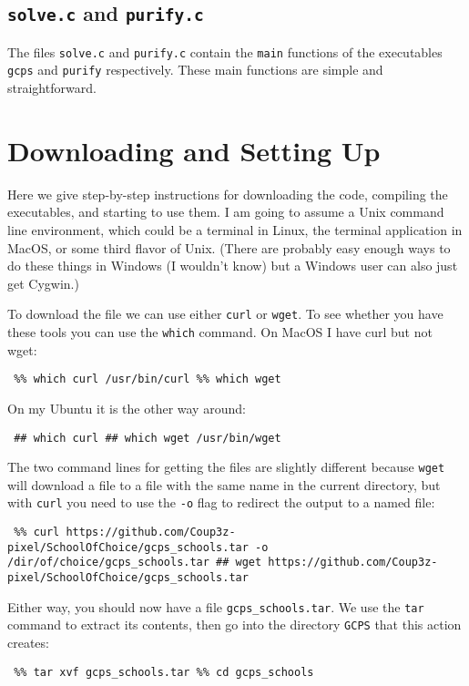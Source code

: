 \documentclass[12pt]{article}
\theoremstyle{definition}
\begin{document}
\begin{appendix}
\subsection{\texttt{solve.c} and  \texttt{purify.c}}

The files \texttt{solve.c} and \texttt{purify.c} contain the
\texttt{main} functions of the executables \texttt{gcps} and
\texttt{purify} respectively.  These main functions are
simple and straightforward.

\section{Downloading and Setting Up} \label{app:DownloadInstall}

Here we give step-by-step instructions for downloading the code,
compiling the executables, and starting to use them.  I am going to
assume a Unix command line environment, which could be a terminal in
Linux, the terminal application in MacOS, or some third flavor of
Unix.  (There are probably easy enough ways to do these things in
Windows (I wouldn't know) but a Windows user can also just get
Cygwin.)

To download the file we can use either \texttt{curl} or \texttt{wget}.
To see whether you have these tools you can use the \texttt{which}
command.  On MacOS I have curl but not wget:
\begin{obeylines}
  \texttt{
    \%\% which curl
    /usr/bin/curl
    \%\% which wget
    }
\end{obeylines}

\medskip\noindent
On my Ubuntu it is the other way around:
\begin{obeylines}
  \texttt{
    \#\# which curl
    \#\# which wget
    /usr/bin/wget
    }
\end{obeylines}
\bigskip
The two command lines for getting the files are slightly different
because \texttt{wget} will download a file to a file with the same
name in the current directory, but with \texttt{curl} you need to use
the \texttt{-o} flag to redirect the output to a named file:
\begin{obeylines}
  \texttt{
    \%\% curl https://github.com/Coup3z-pixel/SchoolOfChoice/gcps\_schools.tar -o /dir/of/choice/gcps\_schools.tar
    \#\# wget https://github.com/Coup3z-pixel/SchoolOfChoice/gcps\_schools.tar
    }
\end{obeylines}
\bigskip

\noindent
Either way, you should now have a file \texttt{gcps\_schools.tar}.  We use the \texttt{tar} command to
extract its contents, then go into the directory \texttt{GCPS} that this action creates:
\begin{obeylines}
  \texttt{
    \%\% tar xvf gcps\_schools.tar
    \%\% cd gcps\_schools
    }
\end{obeylines}
\bigskip


\end{appendix}
\end{document}
